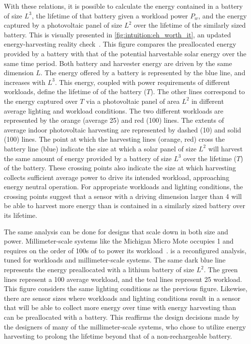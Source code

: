 With these relations, it is possible to calculate the energy contained in a battery of size $L^3$, the lifetime of that battery given a workload power $P_w$, and the energy captured by a photovoltaic panel of size $L^2$ over the lifetime of the similarly sized battery.
This is visually presented in \cref{fig:intuition:eh_worth_it}, 
an updated energy-harvesting reality check~\cite{yervaGrafting12}. 
This figure compares the preallocated energy provided by a battery with that of the potential harvestable solar energy over the same time period. 
Both battery and harvester energy are driven by the same dimension $L$. 
The energy offered by a battery is represented by the blue line, and increases with $L^3$.
This energy, coupled with power requirements of different workloads, define the lifetime of of the battery ($T$).
The other lines correspond to the energy captured over $T$ via a photovoltaic panel of area $L^2$ in different average lighting and workload conditions.
The two different workloads are represented by the orange (average 25\ssi{\micro\watt}) and red (100\ssi{\micro\watt}) lines.
The extents of average indoor photovoltaic harvesting are represented by dashed 
(10\ssi[per-mode=symbol]{\micro\watt\per\centi\meter\squared}) and solid 
(100\ssi[per-mode=symbol]{\micro\watt\per\centi\meter\squared}) lines. 
The point at which the harvesting lines (orange, red) cross the battery line (blue) indicate the size at which a solar panel of size $L^2$ will harvest the same amount of energy provided by a battery of size $L^3$ over the lifetime ($T$) of the battery. 
These crossing points also indicate the size at which harvesting collects sufficient average power to drive its intended workload, approaching energy neutral operation.
For appropriate workloads and lighting conditions, the crossing points suggest that a sensor with a driving dimension larger than 4\ssi{\centi\meter} will be able to harvest more energy than is contained in a similarly sized battery over its lifetime.


The same analysis can be done for designs that scale down in both size and power. Millimeter-scale systems like the Michigan Micro Mote occupies 1\ssi{\milli\meter\squared} and requires on the order of 100s of \ssi{\nano\watt} to power its workload~\cite{lee2013modular}.
 is a reconfigured analysis, tuned for \ssi{\nano\watt} workloads and millimeter-scale systems. The same dark blue line represents the energy preallocated with a lithium battery of size $L^2$. The green lines represent a 100\ssi{\nano\watt} average workload, and the teal lines represent 25\ssi{\nano\watt} workload. This figure considers the same lighting conditions as the previous figure.
Likewise, there are sensor sizes where workloads and lighting conditions result in a sensor that will be able to collect more energy over time with energy harvesting than can be preallocated with a battery.
This reaffirms the design decisions made by the designers of many of the millimeter-scale systems, who chose to utilize energy harvesting to prolong the lifetime beyond that of a non-rechargeable battery. 

